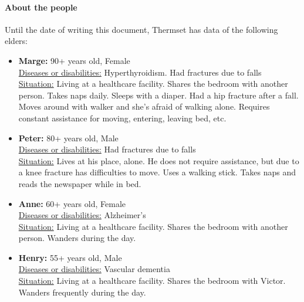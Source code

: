\documentclass[oneside, twocolumn]{article}
\begin{document}
\paragraph{About the people}
Until the date of writing this document, Thermset has data of the following elders:
\begin{itemize}
	\item \textbf{Marge:} 90+ years old, Female \\
			\underline{Diseases or disabilities:} Hyperthyroidism. Had fractures due to falls \\
			\underline{Situation:} Living at a healthcare facility. Shares the bedroom with another person. Takes naps daily. Sleeps with a diaper. Had a hip fracture after a fall. Moves around with walker and she’s afraid of walking alone. Requires constant assistance for moving, entering, leaving bed, etc. \\
	\item \textbf{Peter:} 80+ years old, Male \\
			\underline{Diseases or disabilities:} Had fractures due to falls \\
			\underline{Situation:} Lives at his place, alone. He does not require assistance, but due to a knee fracture has difficulties to move. Uses a walking stick. Takes naps and reads the newspaper while in bed. \\
	\item \textbf{Anne:} 60+ years old, Female \\
			\underline{Diseases or disabilities:} Alzheimer’s \\
			\underline{Situation:} Living at a healthcare facility. Shares the bedroom with another person. Wanders during the day. \\
	\item \textbf{Henry:} 55+ years old,  Male \\
		  	\underline{Diseases or disabilities:} Vascular dementia \\
		  	\underline{Situation:} Living at a healthcare facility. Shares the bedroom with Victor. Wanders frequently during the day. \\


\end{itemize}
\end{document}
